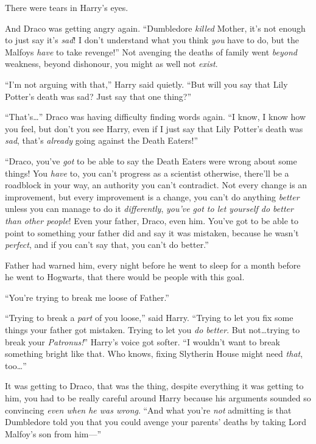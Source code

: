 There were tears in Harry’s eyes.

And Draco was getting angry again. “Dumbledore \emph{killed} Mother, it’s not enough to just say it’s \emph{sad}! I don’t understand what you think \emph{you} have to do, but the Malfoys \emph{have} to take revenge!” Not avenging the deaths of family went \emph{beyond} weakness, beyond dishonour, you might as well not \emph{exist}.

“I’m not arguing with that,” Harry said quietly. “But will you say that Lily Potter’s death was sad? Just say that one thing?”

“That’s…” Draco was having difficulty finding words again. “I know, I know how you feel, but don’t you see Harry, even if I just say that Lily Potter’s death was \emph{sad}, that’s \emph{already} going against the Death Eaters!”

“Draco, you’ve \emph{got} to be able to say the Death Eaters were wrong about some things! You \emph{have} to, you can’t progress as a scientist otherwise, there’ll be a roadblock in your way, an authority you can’t contradict. Not every change is an improvement, but every improvement is a change, you can’t do anything \emph{better} unless you can manage to do it \emph{differently}, \emph{you’ve got to let yourself do better than other people}! Even your father, Draco, even him. You’ve got to be able to point to something your father did and say it was mistaken, because he wasn’t \emph{perfect}, and if you can’t say that, you can’t do better.”

Father had warned him, every night before he went to sleep for a month before he went to Hogwarts, that there would be people with this goal.

“You’re trying to break me loose of Father.”

“Trying to break a \emph{part} of you loose,” said Harry. “Trying to let you fix some things your father got mistaken. Trying to let you \emph{do better}. But not…trying to break your \emph{Patronus!}” Harry’s voice got softer. “I wouldn’t want to break something bright like that. Who knows, fixing Slytherin House might need \emph{that}, too…”

It was getting to Draco, that was the thing, despite everything it was getting to him, you had to be really careful around Harry because his arguments sounded so convincing \emph{even when he was wrong}. “And what you’re \emph{not} admitting is that Dumbledore told you that you could avenge your parents’ deaths by taking Lord Malfoy’s son from him—”

